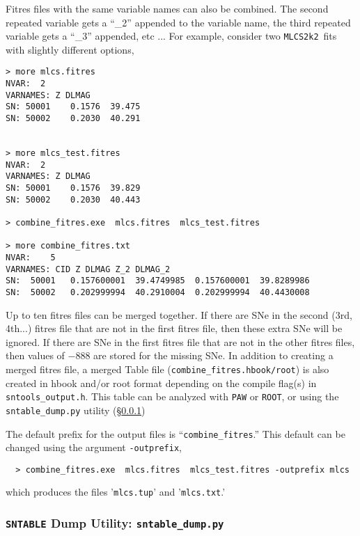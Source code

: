 \documentclass[12pt]{article}
\newcommand{\mlcs}{{\tt MLCS2k2}}
\newcommand{\sndump}{{\tt sntable\_dump.py}}
\begin{document}
{Fitres files with the same variable names can also be combined.
The second repeated variable gets a ``\_2''
appended to the variable name, the third repeated variable
gets a ``\_3'' appended, etc ...
For example, consider two \mlcs\ fits with slightly different
options,


\begin{Verbatim}[frame=single]
> more mlcs.fitres
NVAR:  2
VARNAMES: Z DLMAG 
SN: 50001    0.1576  39.475  
SN: 50002    0.2030  40.291  


> more mlcs_test.fitres
NVAR:  2
VARNAMES: Z DLMAG 
SN: 50001    0.1576  39.829  
SN: 50002    0.2030  40.443  

> combine_fitres.exe  mlcs.fitres  mlcs_test.fitres

> more combine_fitres.txt
NVAR:    5
VARNAMES: CID Z DLMAG Z_2 DLMAG_2 
SN:  50001   0.157600001  39.4749985  0.157600001  39.8289986
SN:  50002   0.202999994  40.2910004  0.202999994  40.4430008
\end{Verbatim}
%
Up to ten fitres files can be merged together.
If there are SNe in the second (3rd, 4th...) fitres file 
that are not in the first fitres file, 
then  these extra SNe will be ignored.
If there are SNe in the first fitres file that are not in
the other fitres files, then values of $-888$ are stored
for the missing SNe.
In addition to creating a merged fitres file, a merged
Table file ({\tt combine\_fitres.hbook/root}) is also created
in hbook and/or root format depending on the compile flag(s)
in {\tt sntools\_output.h}.
This table can be analyzed with {\tt PAW} or {\tt ROOT},
or using the {\sndump} utility (\S\ref{sss:sntable_dump})


The default prefix for the output files is ``{\tt combine\_fitres}.''
This default can be changed using the argument {\tt -outprefix},
\begin{verbatim}
  > combine_fitres.exe  mlcs.fitres  mlcs_test.fitres -outprefix mlcs
\end{verbatim}
which produces the files '{\tt mlcs.tup}' and '{\tt mlcs.txt}.'


  \subsubsection{{\tt SNTABLE} Dump Utility: {\sndump} }
  \label{sss:sntable_dump}

}
\end{document}
